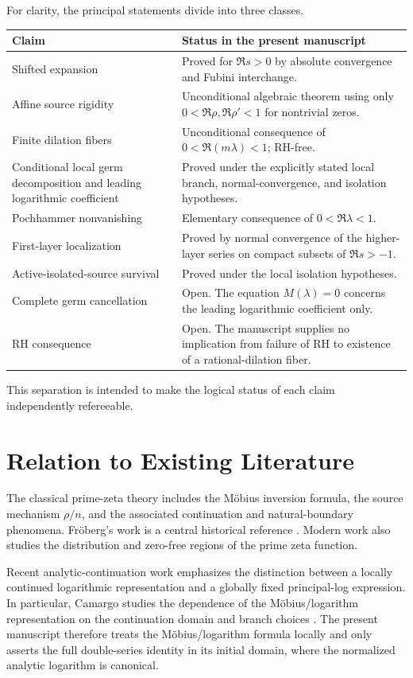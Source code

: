 \documentclass[11pt]{article}
\theoremstyle{definition}
\begin{document}
For clarity, the principal statements divide into three classes.

\begin{center}
\begin{tabular}{p{}p{}}
\toprule
Claim & Status in the present manuscript\\
\midrule
Shifted expansion &
Proved for $\Re s>0$ by absolute convergence and Fubini interchange.\\
Affine source rigidity &
Unconditional algebraic theorem using only $0<\Re\rho,\Re\rho'<1$ for nontrivial zeros.\\
Finite dilation fibers &
Unconditional consequence of $0<\Re(m\lambda)<1$; RH-free.\\
Conditional local germ decomposition and leading logarithmic coefficient &
Proved under the explicitly stated local branch, normal-convergence, and isolation hypotheses.\\
Pochhammer nonvanishing &
Elementary consequence of $0<\Re\lambda<1$.\\
First-layer localization &
Proved by normal convergence of the higher-layer series on compact subsets of $\Re s>-1$.\\
Active-isolated-source survival &
Proved under the local isolation hypotheses.\\
Complete germ cancellation &
Open. The equation $M(\lambda)=0$ concerns the leading logarithmic coefficient only.\\
RH consequence &
Open. The manuscript supplies no implication from failure of RH to existence of a rational-dilation fiber.\\
\bottomrule
\end{tabular}
\end{center}

This separation is intended to make the logical status of each claim independently refereeable.

\section{Relation to Existing Literature}

The classical prime-zeta theory includes the Möbius inversion formula, the source mechanism $\rho/n$, and the associated continuation and natural-boundary phenomena. Fröberg's work is a central historical reference \cite{Froberg}. Modern work also studies the distribution and zero-free regions of the prime zeta function.

Recent analytic-continuation work emphasizes the distinction between a locally continued logarithmic representation and a globally fixed principal-log expression. In particular, Camargo studies the dependence of the Möbius/logarithm representation on the continuation domain and branch choices \cite{Camargo}. The present manuscript therefore treats the Möbius/logarithm formula locally and only asserts the full double-series identity in its initial domain, where the normalized analytic logarithm is canonical.
\end{document}
